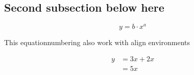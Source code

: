 
\subsection{Second subsection below here}

\blindtext
\begin{equation}
y = b\cdot x^a
\end{equation}


This equationnumbering also work with align environments

\begin{align}
  y &= 3x + 2x \\
  & = 5x
\end{align}
